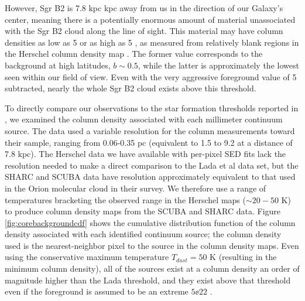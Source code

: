 \documentclass{emulateapj}
\newcommand{\dsgrb}{7.8 kpc\xspace}
\begin{document}
However, Sgr B2 is \dsgrb kpc away from us in the direction of our Galaxy's
center, meaning there is a potentially enormous amount of material unassociated
with the Sgr B2 cloud along the line of sight.  This material may have column
densities as low as
5 \persc or as high as 5 \persc, as measured from relatively
blank regions in the Herschel column density map \citep{Battersby2011a}.  The
former value corresponds to
the background at high latitudes, $b\sim0.5$, while the latter  is
approximately the lowest seen within our field of view. 
Even with the very aggressive foreground value of 5 \persc subtracted,
nearly the whole Sgr B2 cloud exists above this threshold.

To directly compare our observations to the star formation thresholds reported
in \citet{Lada2010a}, we examined the column density associated with each
millimeter continuum source.  The \citet{Lada2010a} data used a variable
resolution for the column measurements toward their sample, ranging from
0.06-0.35 pc (equivalent to 1.5 to 9.2 \arcsec at a distance of \dsgrb).  The
Herschel data we have available with per-pixel SED fits lack the resolution
needed to make a direct comparison to the Lada et al data set, but the SHARC
and SCUBA data have resolution approximately equivalent to that used in the
Orion molecular cloud in their survey.  We therefore use a range of temperatures
bracketing the observed range in the Herschel maps ($\sim20-50$ K) to produce
column density maps from the SCUBA and SHARC data.  Figure
\ref{fig:corebackgroundcdf} shows the cumulative distribution function of the
column density associated with each identified continuum source; the column
density used is the nearest-neighbor pixel to the source in the column density
maps.  Even using the conservative maximum temperature $T_{dust}=50$ K
(resulting in the minimum column density), all of the sources exist at a column
density an order of magnitude higher than the Lada threshold, and they exist
above that threshold even if the foreground is assumed to be an extreme $5\ee{22}$
\persc.
\end{document}
